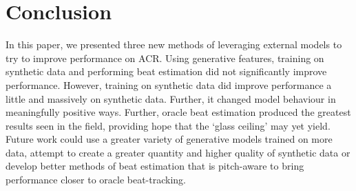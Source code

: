 \section{Conclusion}\label{sec:conclusion}

In this paper, we presented three new methods of leveraging external models to try to improve performance on ACR. Using generative features, training on synthetic data and performing beat estimation did not significantly improve performance. However, training on synthetic data did improve performance a little and massively on synthetic data. Further, it changed model behaviour in meaningfully positive ways. Further, oracle beat estimation produced the greatest  results seen in the field, providing hope that the `glass ceiling' may yet yield. Future work could use a greater variety of generative models trained on more data, attempt to create a greater quantity and higher quality of synthetic data or develop better methods of beat estimation that is pitch-aware to bring performance closer to oracle beat-tracking. 